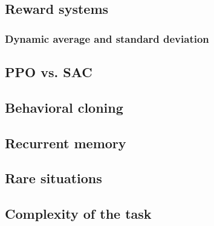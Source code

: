 \subsection{Reward systems}
\label{sec:rtrewsys}



\subsubsection{Dynamic average and standard deviation}

\subsection{PPO vs. SAC}

\subsection{Behavioral cloning}

\subsection{Recurrent memory} %

\subsection{Rare situations}

\subsection{Complexity of the task}